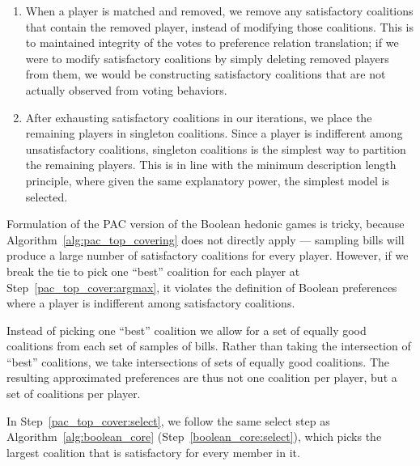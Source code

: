 \begin{enumerate}
  \item When a player is matched and removed, we remove any satisfactory coalitions that
    contain the removed player, instead of modifying those coalitions.
    This is to maintained integrity of the votes to preference relation
    translation; if we were to modify satisfactory coalitions by simply
    deleting removed players from them, we would be constructing satisfactory
    coalitions that are not actually observed from voting behaviors.
  \item After exhausting satisfactory coalitions in our iterations, we place
    the remaining players in singleton coalitions.
    Since a player is indifferent among unsatisfactory coalitions, singleton
    coalitions is the simplest way to partition the remaining players.
    This is in line with the minimum description length principle, where given
    the same explanatory power, the simplest model is selected.
\end{enumerate}

Formulation of the PAC version of the Boolean hedonic games is tricky, because
Algorithm~\ref{alg:pac_top_covering} does not directly apply --- sampling bills
will produce a large number of satisfactory coalitions for every player. However, if we break the tie to pick one ``best'' coalition for each player at
Step~\ref{pac_top_cover:argmax}, it violates the definition of Boolean
preferences where a player is indifferent among satisfactory coalitions.

Instead of picking one ``best'' coalition we allow for a set of equally good
coalitions from each set of samples of bills.
Rather than taking the intersection of ``best'' coalitions, we take intersections
of sets of equally good coalitions.
The resulting approximated preferences are thus not one coalition per player,
but a set of coalitions per player.

In Step~\ref{pac_top_cover:select}, we follow the same select step as
Algorithm~\ref{alg:boolean_core} (Step~\ref{boolean_core:select}), which picks
the largest coalition that is satisfactory for every member in it.
